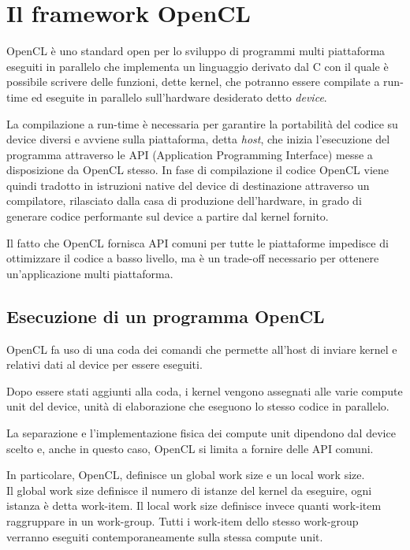 \chapter{Il framework OpenCL}
\vspace{4cm}
OpenCL è uno standard open per lo sviluppo di programmi multi piattaforma eseguiti in parallelo che implementa un linguaggio derivato dal C con il quale è possibile scrivere delle funzioni, dette kernel, che potranno essere compilate a run-time ed eseguite in parallelo sull'hardware desiderato detto \textit{device}.

La compilazione a run-time è necessaria per garantire la portabilità del codice su device diversi e avviene sulla piattaforma, detta \textit{host}, che inizia l'esecuzione del programma attraverso le API (Application Programming Interface) messe a disposizione da OpenCL stesso.
In fase di compilazione il codice OpenCL viene quindi tradotto in istruzioni native del device di destinazione attraverso un compilatore, rilasciato dalla casa di produzione dell'hardware, in grado di generare codice performante sul device a partire dal kernel fornito.

Il fatto che OpenCL fornisca API comuni per tutte le piattaforme impedisce di ottimizzare il codice a basso livello, ma è un trade-off necessario per ottenere un'applicazione multi piattaforma.

\section{Esecuzione di un programma OpenCL}
OpenCL fa uso di una coda dei comandi che permette all'host di inviare kernel e relativi dati al device per essere eseguiti.

Dopo essere stati aggiunti alla coda, i kernel vengono assegnati alle varie compute unit del device, unità di elaborazione che eseguono lo stesso codice in parallelo.
 
La separazione e l'implementazione fisica dei compute unit dipendono dal device scelto e, anche in questo caso, OpenCL si limita a fornire delle API comuni.

In particolare, OpenCL, definisce un global work size e un local work size. \\
Il global work size definisce il numero di istanze del kernel da eseguire, ogni istanza è detta work-item.
Il local work size definisce invece quanti work-item raggruppare in un work-group. Tutti i work-item dello stesso work-group verranno eseguiti contemporaneamente sulla stessa compute unit.

